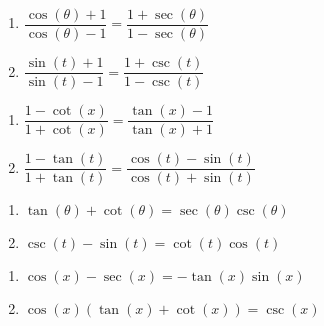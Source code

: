 \documentclass{ximera}
\begin{document}
\begin{multicols}{2}

\begin{enumerate}

\setcounter{enumi}{\value{HW}}

\item $\dfrac{\cos(\theta) + 1}{\cos(\theta) - 1} = \dfrac{1 + \sec(\theta)}{1 - \sec(\theta)}$
\item $\dfrac{\sin(t) + 1}{\sin(t) - 1} = \dfrac{1 + \csc(t)}{1 - \csc(t)}$

\setcounter{HW}{\value{enumi}}

\end{enumerate}

\end{multicols}

\begin{multicols}{2}

\begin{enumerate}

\setcounter{enumi}{\value{HW}}

\item $\dfrac{1 - \cot(x)}{1+ \cot(x)} = \dfrac{\tan(x) - 1}{\tan(x) + 1}$
\item $\dfrac{1 - \tan(t)}{1+ \tan(t)} = \dfrac{\cos(t) - \sin(t)}{\cos(t) + \sin(t)}$

\setcounter{HW}{\value{enumi}}

\end{enumerate}

\end{multicols}

\begin{multicols}{2}

\begin{enumerate}

\setcounter{enumi}{\value{HW}}

\item $\tan(\theta) + \cot(\theta) = \sec(\theta)\csc(\theta)$
\item $\csc(t) - \sin(t) = \cot(t)\cos(t)$

\setcounter{HW}{\value{enumi}}

\end{enumerate}

\end{multicols}

\begin{multicols}{2}

\begin{enumerate}

\setcounter{enumi}{\value{HW}}

\item $\cos(x) - \sec(x) = -\tan(x)\sin(x)$
\item $\cos(x)(\tan(x) + \cot(x)) = \csc(x)$

\setcounter{HW}{\value{enumi}}

\end{enumerate}

\end{multicols}
\end{document}
